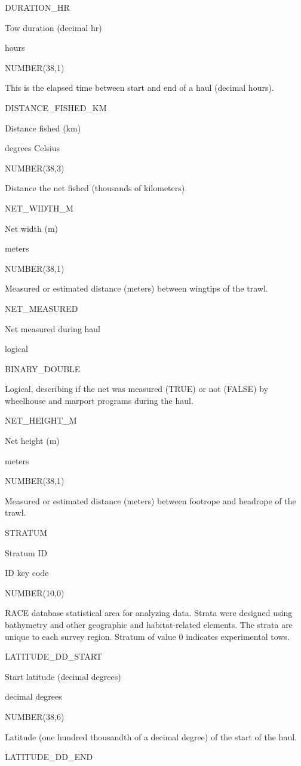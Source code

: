 \documentclass[
  letterpaper,
  oneside,
  open=any]{scrbook}
\begin{document}
DURATION\_HR

Tow duration (decimal hr)

hours

NUMBER(38,1)

This is the elapsed time between start and end of a haul (decimal
hours).

DISTANCE\_FISHED\_KM

Distance fished (km)

degrees Celsius

NUMBER(38,3)

Distance the net fished (thousands of kilometers).

NET\_WIDTH\_M

Net width (m)

meters

NUMBER(38,1)

Measured or estimated distance (meters) between wingtips of the trawl.

NET\_MEASURED

Net measured during haul

logical

BINARY\_DOUBLE

Logical, describing if the net was measured (TRUE) or not (FALSE) by
wheelhouse and marport programs during the haul.

NET\_HEIGHT\_M

Net height (m)

meters

NUMBER(38,1)

Measured or estimated distance (meters) between footrope and headrope of
the trawl.

STRATUM

Stratum ID

ID key code

NUMBER(10,0)

RACE database statistical area for analyzing data. Strata were designed
using bathymetry and other geographic and habitat-related elements. The
strata are unique to each survey region. Stratum of value 0 indicates
experimental tows.

LATITUDE\_DD\_START

Start latitude (decimal degrees)

decimal degrees

NUMBER(38,6)

Latitude (one hundred thousandth of a decimal degree) of the start of
the haul.

LATITUDE\_DD\_END
\end{document}
